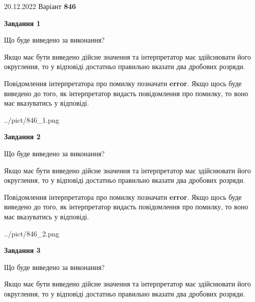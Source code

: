 \documentclass[12pt, ukrainian]{article}
\begin{document}
{20.12.2022 Варіант \No \textbf { 846 }\par}
{
\begin {Large}

{\begin {center}\textbf{Завдання 1}\end {center}}\par
Що буде виведено за виконання? \par

Якщо має бути виведено дійсне значення та інтерпретатор має здійснювати його округлення, 
то у відповіді достатньо правильно вказати два дробових розряди.

Повідомлення інтерпретатора про помилку позначати \textbf{error}.
Якщо щось буде виведено до того, як інтерпретатор видасть повідомлення про помилку, 
то воно має вказуватись у відповіді. \par

\begin{center}
	{../pict/846_1.png}
\end{center}
\newpage

{\begin {center}\textbf{Завдання 2}\end {center}}\par
Що буде виведено за виконання? \par

Якщо має бути виведено дійсне значення та інтерпретатор має здійснювати його округлення, 
то у відповіді достатньо правильно вказати два дробових розряди.

Повідомлення інтерпретатора про помилку позначати \textbf{error}.
Якщо щось буде виведено до того, як інтерпретатор видасть повідомлення про помилку, 
то воно має вказуватись у відповіді. \par

\begin{center}
	{../pict/846_2.png}
\end{center}
\newpage

{\begin {center}\textbf{Завдання 3}\end {center}}\par
Що буде виведено за виконання? \par

Якщо має бути виведено дійсне значення та інтерпретатор має здійснювати його округлення, 
то у відповіді достатньо правильно вказати два дробових розряди.


\end{Large}}
\end{document}
